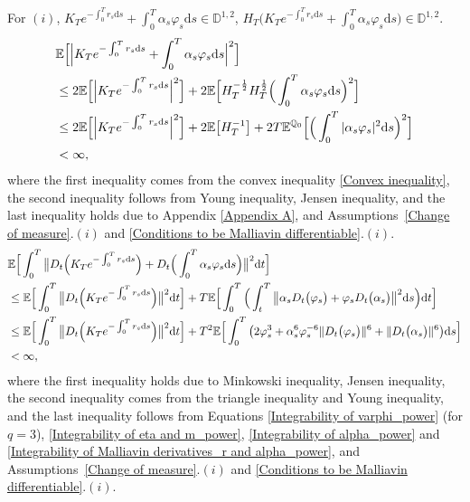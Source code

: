 \documentclass[12,reqno]{amsart}
\numberwithin{equation}{section}
\begin{document}
For $(i)$, $K_{T}e^{-\int_{0}^{T}r_{s}\mathrm{d}s}+\int_{0}^{T}\alpha_{s}\varphi_{s}\mathrm{d}s\in\mathbb{D}^{1,2}$, $H_{T}\Big(K_{T}e^{-\int_{0}^{T}r_{s}\mathrm{d}s}+\int_{0}^{T}\alpha_{s} \varphi_{s}\mathrm{d}s\Big)\in\mathbb{D}^{1,2}$.
\begin{align}\label{E1_Proposition 4.1}
	&\mathbb{E}\Big[\Big|K_{T}e^{-\int_{0}^{T}r_{s}\mathrm{d}s}+\int_{0}^{T}\alpha_{s}\varphi_{s}\mathrm{d}s\Big|^{2}\Big]\notag\\
	&\le2\mathbb{E}\Big[\Big|K_{T}e^{-\int_{0}^{T}r_{s}\mathrm{d}s}\Big|^{2}\Big]+2\mathbb{E}\Big[H_{T}^{-\frac{1}{2}}H_{T}^{\frac{1}{2}}\Big(\int_{0}^{T}\alpha_{s}\varphi_{s}\mathrm{d}s\Big)^{2}\Big]\notag\\
	&\le2\mathbb{E}\Big[\Big|K_{T}e^{-\int_{0}^{T}r_{s}\mathrm{d}s}\Big|^{2}\Big]+2\mathbb{E}\big[H_{T}^{-1}\big]+2T\mathbb{E}^{\mathbb{Q}_{0}}\Big[\Big(\int_{0}^{T}|\alpha_{s}\varphi_{s}|^{2}\mathrm{d}s\Big)^{2}\Big]\notag\\
	&<\infty,
\end{align}
where the first inequality comes from the convex inequality \eqref{Convex inequality}, the second inequality follows from Young inequality, Jensen inequality, and the last inequality holds due to Appendix \ref{Appendix A}, and Assumptions~\ref{Change of measure}$.(i)$ and \ref{Conditions to be Malliavin differentiable}$.(i)$.
\begin{align}\label{E2_Proposition 4.1}
	&\mathbb{E}\Big[\int_{0}^{T}\big\|D_{t}\Big(K_{T}e^{-\int_{0}^{T}r_{s}\mathrm{d}s}\Big)+D_{t}\Big(\int_{0}^{T}\alpha_{s}\varphi_{s}\mathrm{d}s\Big)\big\|^{2}\mathrm{d}t\Big]\notag\\
	&\le\mathbb{E}\Big[\int_{0}^{T}\big\|D_{t}\Big(K_{T}e^{-\int_{0}^{T}r_{s}\mathrm{d}s}\Big)\big\|^{2}\mathrm{d}t\Big]+T\mathbb{E}\Big[\int_{0}^{T}\Big(\int_{t}^{T}\big\|\alpha_{s}D_{t}\big(\varphi_{s}\big)+\varphi_{s}D_{t}\big(\alpha_{s}\big)\big\|^{2}\mathrm{d}s\Big)\mathrm{d}t\Big]\notag\\
	&\le\mathbb{E}\Big[\int_{0}^{T}\big\|D_{t}\Big(K_{T}e^{-\int_{0}^{T}r_{s}\mathrm{d}s}\Big)\big\|^{2}\mathrm{d}t\Big]+T^{2}\mathbb{E}\Big[\int_{0}^{T}\big(2\varphi_{s}^{3}+\alpha_{s}^{6}\varphi_{s}^{-6}\|D_{t}\big(\varphi_{s}\big)\|^{6}+\|D_{t}\big(\alpha_{s}\big)\|^{6}\big)\mathrm{d}s\Big]\notag\\
	&<\infty,
\end{align}
where the first inequality holds due to Minkowski inequality, Jensen inequality, the second inequality comes from the triangle inequality and Young inequality, and the last inequality follows from Equations \eqref{Integrability of varphi_power} (for $q=3$), \eqref{Integrability of eta and m_power}, \eqref{Integrability of alpha_power} and \eqref{Integrability of Malliavin derivatives_r and alpha_power}, and Assumptions~\ref{Change of measure}$.(i)$ and \ref{Conditions to be Malliavin differentiable}$.(i)$.
\end{document}
